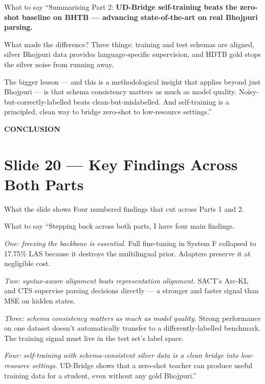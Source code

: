 \documentclass[11pt]{article}
\begin{document}
\begin{pitchbox}{What to say}
``Summarising Part 2: \textbf{UD-Bridge self-training beats the zero-shot baseline on BHTB --- advancing state-of-the-art on real Bhojpuri parsing.}

What made the difference? Three things: training and test schemas are aligned, silver Bhojpuri data provides language-specific supervision, and HDTB gold stops the silver noise from running away.

The bigger lesson --- and this is a methodological insight that applies beyond just Bhojpuri --- is that schema consistency matters as much as model quality. Noisy-but-correctly-labelled beats clean-but-mislabelled. And self-training is a principled, clean way to bridge zero-shot to low-resource settings.''
\end{pitchbox}

\clearpage

\begin{center}
{\LARGE\bfseries\color{accent}CONCLUSION}
\end{center}

\section{Slide 20 --- Key Findings Across Both Parts}

\begin{pitchbox}{What the slide shows}
Four numbered findings that cut across Parts 1 and 2.
\end{pitchbox}

\begin{pitchbox}{What to say}
``Stepping back across both parts, I have four main findings.

\textit{One: freezing the backbone is essential.} Full fine-tuning in System F collapsed to 17.75\% LAS because it destroys the multilingual prior. Adapters preserve it at negligible cost.

\textit{Two: syntax-aware alignment beats representation alignment.} SACT's Arc-KL and CTS supervise parsing decisions directly --- a stronger and faster signal than MSE on hidden states.

\textit{Three: schema consistency matters as much as model quality.} Strong performance on one dataset doesn't automatically transfer to a differently-labelled benchmark. The training signal must live in the test set's label space.

\textit{Four: self-training with schema-consistent silver data is a clean bridge into low-resource settings.} UD-Bridge shows that a zero-shot teacher can produce useful training data for a student, even without any gold Bhojpuri.''
\end{pitchbox}
\end{document}
